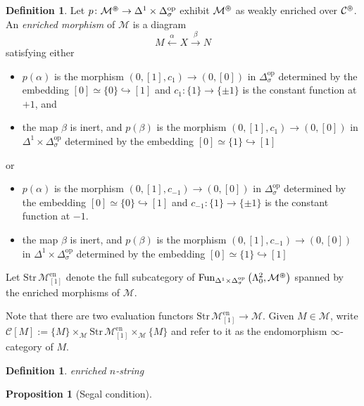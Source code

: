 \documentclass{article}
\DeclareMathOperator{\Fun}{Fun} %
\newcommand{\op}{\mathrm{op}}
\newtheorem{proposition}[theorem]{Proposition}
\theoremstyle{definition}
\newtheorem{definition}[theorem]{Definition}
\begin{document}
\begin{definition}
    Let $ p \colon \mathcal{M}^\varoast  \to \Delta^1\times \Delta^\op_\sigma $ exhibit $ \mathcal{M}^\varoast $ as weakly enriched over $ \mathcal{C}^\varoast $. 
    An \emph{enriched morphism} of $ \mathcal{M} $ is a diagram 
    \begin{equation*}
        M \xleftarrow{\alpha} X \xrightarrow{\beta} N
    \end{equation*}
    satisfying either 
    \begin{itemize}
        \item $ p (\alpha) $ is the morphism $ (0, [1], c_{1}) \to (0,[0]) $ in $ \Delta^\op_\sigma $ determined by the embedding $ [0] \simeq \{0\} \hookrightarrow [1] $ and $ c_1 \colon \{1\} \to \{\pm 1\} $ is the constant function at $ +1 $, and
        \item the map $ \beta $ is inert, and $ p(\beta) $ is the morphism $ (0,[1], c_{1}) \to (0, [0]) $ in $ \Delta^1 \times \Delta^\op_\sigma $ determined by the embedding $ [0]\simeq \{1\} \hookrightarrow [1] $
    \end{itemize}
    or
    \begin{itemize}
        \item $ p (\alpha) $ is the morphism $ (0, [1], c_{-1}) \to (0,[0]) $ in $ \Delta^\op_\sigma $ determined by the embedding $ [0] \simeq \{0\} \hookrightarrow [1] $ and $ c_{-1} \colon \{1\} \to \{\pm 1\} $ is the constant function at $ -1 $. 
        \item the map $ \beta $ is inert, and $ p(\beta) $ is the morphism $ (0,[1], c_{-1}) \to (0, [0]) $ in $ \Delta^1 \times \Delta^\op_\sigma $ determined by the embedding $ [0]\simeq \{1\} \hookrightarrow [1] $
    \end{itemize}
    Let $ \mathrm{Str}\, \mathcal{M}^{\mathrm{en}}_{[1]} $ denote the full subcategory of $ \Fun_{\Delta^1 \times \Delta^\op_\sigma }\left(\Lambda^2_0, \mathcal{M}^{\varoast} \right) $ spanned by the enriched morphisms of $ \mathcal{M} $. 

    Note that there are two evaluation functors $ \mathrm{Str}\, \mathcal{M}^{\mathrm{en}}_{[1]} \to \mathcal{M} $. 
    Given $ M \in \mathcal{M} $, write $ \mathcal{C}[M] := \{M\} \times_{\mathcal{M}} \mathrm{Str}\, \mathcal{M}^{\mathrm{en}}_{[1]} \times_{\mathcal{M}} \{M\} $ and refer to it as the endomorphism $ \infty $-category of $ M $. 
\end{definition} 
\begin{definition}
    \emph{enriched $ n $-string} 
\end{definition}
\begin{proposition}
    [Segal condition] 
\end{proposition}
\end{document}
